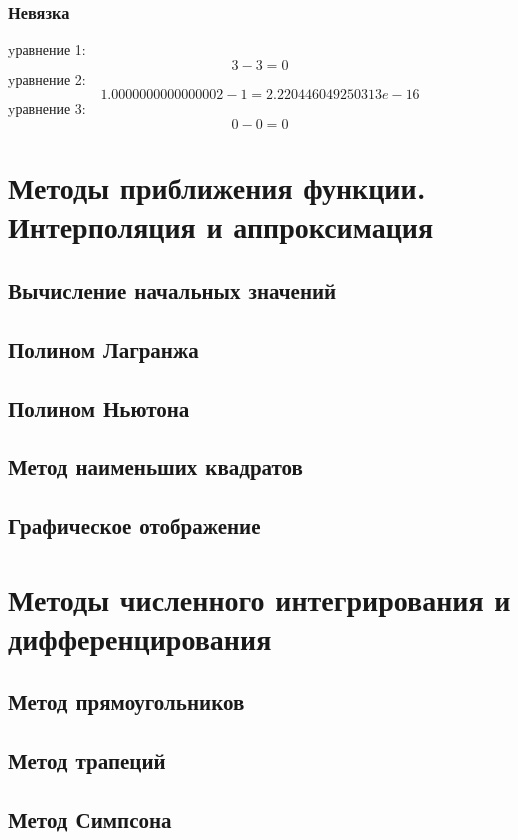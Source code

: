 \documentclass{article}
\begin{document}
\subsubsection{Невязка}
yравнение 1:
\begin{displaymath}
  3-3 = 0  
\end{displaymath}
yравнение 2:
\begin{displaymath}
  1.0000000000000002 - 1 = 2.220446049250313e-16
\end{displaymath}
yравнение 3:
\begin{displaymath}
  0 - 0 = 0
\end{displaymath}

\section{Методы приближения функции. Интерполяция и аппроксимация}
\subsection{Вычисление начальных значений}
\subsection{Полином Лагранжа}
\subsection{Полином Ньютона}
\subsection{Метод наименьших квадратов}
\subsection{Графическое отображение}

\section{Методы численного интегрирования и дифференцирования}
\subsection{Метод прямоугольников}
\subsection{Метод трапеций}
\subsection{Метод Симпсона}
\end{document}
